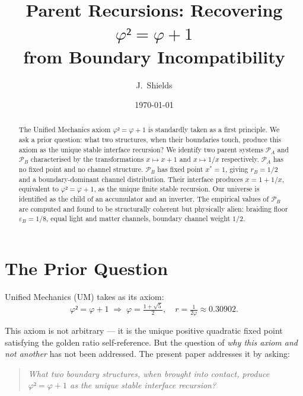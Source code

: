 \documentclass[prd,twocolumn,preprintnumbers,amsmath,amssymb]{revtex4-2}
\newcommand{\parentA}{\mathcal{P}_A}
\newcommand{\parentB}{\mathcal{P}_B}
\begin{document}
\title{Parent Recursions: Recovering $φ² = φ + 1$\\
from Boundary Incompatibility}

\author{J.~Shields}
\date{\today}

\begin{abstract}
The Unified Mechanics axiom $φ² = φ + 1$ is standardly taken as a first
principle. We ask a prior question: what two structures, when their
boundaries touch, produce this axiom as the unique stable interface
recursion? We identify two parent systems $\parentA$ and $\parentB$
characterised by the transformations $x \mapsto x + 1$ and
$x \mapsto 1/x$ respectively. $\parentA$ has no fixed point and no
channel structure. $\parentB$ has fixed point $x^* = 1$, giving
$r_B = 1/2$ and a boundary-dominant channel distribution.
Their interface produces $x = 1 + 1/x$, equivalent to $φ² = φ + 1$,
as the unique finite stable recursion. Our universe is identified as
the child of an accumulator and an inverter. The empirical values of
$\parentB$ are computed and found to be structurally coherent but
physically alien: braiding floor $\varepsilon_B = 1/8$, equal
light and matter channels, boundary channel weight $1/2$.
\end{abstract}

\maketitle

\section{The Prior Question}

Unified Mechanics (UM) takes as its axiom:
\begin{equation}
  φ² = φ + 1
  \;\Longrightarrow\;
  \varphi = \tfrac{1+\sqrt{5}}{2}, \quad
  r = \tfrac{1}{2\varphi} \approx 0.30902.
  \label{eq:axiom}
\end{equation}

This axiom is not arbitrary --- it is the unique positive quadratic
fixed point satisfying the golden ratio self-reference. But the
question of \emph{why this axiom and not another} has not been
addressed. The present paper addresses it by asking:

\begin{quote}
\textit{What two boundary structures, when brought into contact,
produce $φ² = φ + 1$ as the unique stable interface recursion?}
\end{quote}
\end{document}
